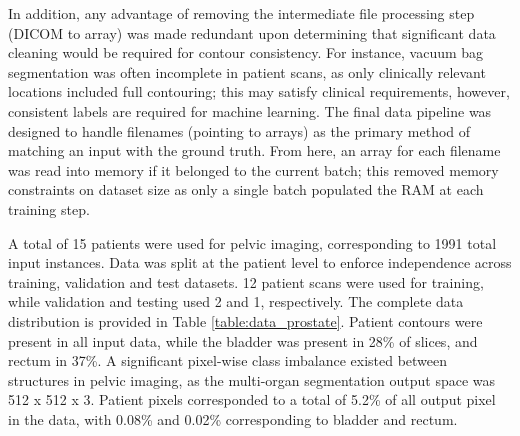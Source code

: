 In addition, any advantage of removing the intermediate file processing step (DICOM to array) was made redundant upon determining that significant data cleaning would be required for contour consistency.
For instance, vacuum bag segmentation was often incomplete in patient scans, as only clinically relevant locations included full contouring; this may satisfy clinical requirements, however, consistent labels
are required for machine learning. The final data pipeline was designed to handle filenames (pointing to arrays) as the primary method of matching an input with the ground truth. From here, an array for each filename was read into memory if it belonged to the current batch; this removed memory constraints on dataset size as only a single batch populated the RAM at each training step.

A total of 15 patients were used for pelvic imaging, corresponding to 1991 total input instances. Data was split at the patient level to enforce independence across training, validation and test datasets. 12 patient scans were used for training, while validation and testing used 2 and 1, respectively. The complete data distribution is provided in Table \ref{table:data_prostate}. Patient contours were present in all input data, while the bladder was present in 28\% of slices, and rectum in 37\%. A significant pixel-wise class imbalance existed between structures in pelvic imaging, as the multi-organ segmentation output space was 512 x 512 x 3. Patient pixels corresponded to a total of 5.2\% of all output pixel in the data, with 0.08\% and 0.02\% corresponding to bladder and rectum.

